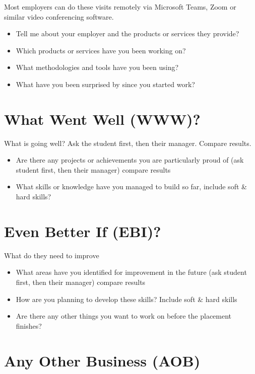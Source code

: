 \documentclass[
]{book}
\providecommand{\tightlist}{%
  \setlength{\itemsep}{0pt}\setlength{\parskip}{0pt}}
\begin{document}
Most employers can do these visits remotely via Microsoft Teams, Zoom or similar video conferencing software.

\begin{itemize}
\tightlist
\item
  Tell me about your employer and the products or services they provide?
\item
  Which products or services have you been working on?
\item
  What methodologies and tools have you been using?
\item
  What have you been surprised by since you started work?
\end{itemize}

\section{What Went Well (WWW)?}\label{www}

What is going well? Ask the student first, then their manager. Compare results.

\begin{itemize}
\tightlist
\item
  Are there any projects or achievements you are particularly proud of (ask student first, then their manager) compare results
\item
  What skills or knowledge have you managed to build so far, include soft \& hard skills?
\end{itemize}

\section{Even Better If (EBI)?}\label{ebi}

What do they need to improve

\begin{itemize}
\tightlist
\item
  What areas have you identified for improvement in the future (ask student first, then their manager) compare results
\item
  How are you planning to develop these skills? Include soft \& hard skills
\item
  Are there any other things you want to work on before the placement finishes?
\end{itemize}

\section{Any Other Business (AOB)}\label{aob}
\end{document}
